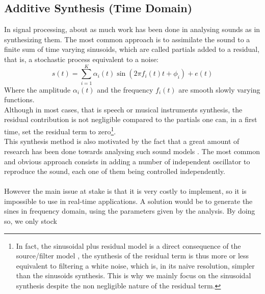 \documentclass[]{article}
\begin{document}
\subsection{Additive Synthesis (Time Domain)}\label{sec:additive-synthesis-(time-domain)}
\hspace{15pt}In signal processing, about as much work has been done in analysing sounds as in synthesizing them. The most common approach is to assimilate the sound to a finite sum of time varying sinusoids, which are called partials \cite{quatieri2002audio} added to a residual, that is, a stochastic process equivalent to a noise:
\begin{equation}
s(t) = \sum_{i=1}^{K}\alpha_i(t) \sin(2\pi f_i(t) t + \phi_{i}) + e(t)
\end{equation}
Where the amplitude $\alpha_i(t)$ and the frequency $f_i(t)$ are smooth slowly varying functions.\\
Although in most cases, that is speech or musical instruments synthesis, the residual contribution is not negligible compared to the partials \cite{quatieri2002audio, rodet1992spectral} one can, in a first time, set the residual term to zero\footnote{In fact, the sinusoidal plus residual model is a direct consequence of the source/filter model \cite{mcaulay1986speech}, the synthesis of the residual term is thus more or less equivalent to filtering a white noise, which is, in its naive resolution, simpler than the sinusoids synthesis. This is why we mainly focus on the sinusoidal synthesis despite the non negligible nature of the residual term.}.\\
This synthesis method is also motivated by the fact that a great amount of research has been done towards analysing such sound models \cite{rodet1992spectral, depalle1993tracking}. The most common and obvious approach consists in adding a number of independent oscillator to reproduce the sound, each one of them being controlled independently.\\
\\
However the main issue at stake is that it is very costly to implement, so it is impossible to use in real-time applications. A solution would be to generate the sines in frequency domain, using the parameters given by the analysis. By doing so, we only stock \\
\end{document}

